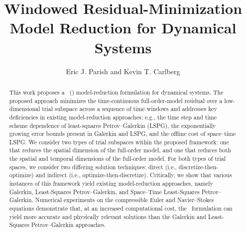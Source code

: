 \documentclass[3p,computermodern,10pt]{elsarticle}
\begin{document}
\begin{frontmatter}

\title{Windowed Residual-Minimization Model Reduction for Dynamical Systems}

\author[a]{Eric J. Parish and Kevin T. Carlberg}

\address[a]{Sandia National Laboratories,  Livermore, CA}
\begin{abstract}
This work proposes a \methodNameLower\ (\methodAcronym) model-reduction
	formulation for dynamical systems. The proposed approach minimizes the
	time-continuous full-order-model residual over a low-dimensional 
	trial subspace across a sequence of time windows and addresses key deficiencies in existing model-reduction approaches; e.g., the time step and time scheme dependence of least-squares Petrov--Galerkin (LSPG), the exponentially growing error bounds present in Galerkin and LSPG, and the offline cost of space--time LSPG. 
We consider two types of trial subspaces
	within the proposed framework:
	one that reduces the spatial dimension of the full-order model, and one that
	reduces both the spatial and temporal dimensions of the full-order model. For both types of trial spaces, we consider two differing solution techniques: direct (i.e., discretize-then-optimize) and indirect (i.e., optimize-then-discretize). Critically, we show that various instances of this framework yield existing model-reduction approaches, namely Galerkin, Least-Squares Petrov–Galerkin, and Space–Time Least-Squares Petrov– Galerkin. Numerical experiments on the compressible Euler and Navier--Stokes equations demonstrate that, at an increased computational cost, the \methodAcronym\ formulation can yield more accurate and physically relevant solutions than the Galerkin and Least-Squares Petrov--Galerkin approaches. 






\end{abstract}
\end{frontmatter}
\end{document}
